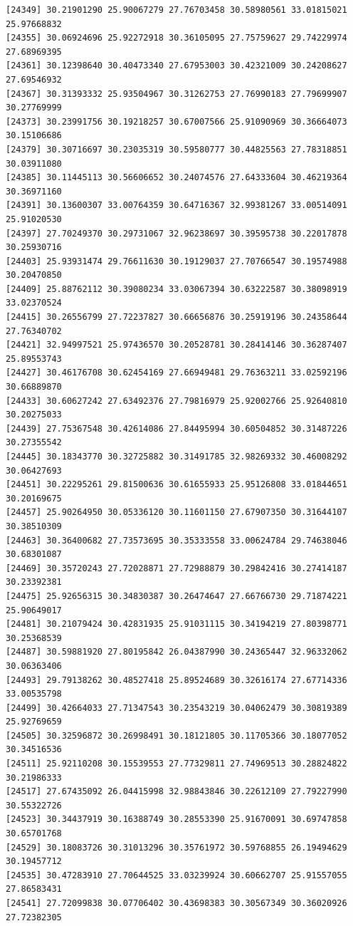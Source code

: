 \documentclass[
  letterpaper,
  DIV=11,
  numbers=noendperiod]{scrartcl}
\begin{document}
\begin{verbatim}
[24349] 30.21901290 25.90067279 27.76703458 30.58980561 33.01815021 25.97668832
[24355] 30.06924696 25.92272918 30.36105095 27.75759627 29.74229974 27.68969395
[24361] 30.12398640 30.40473340 27.67953003 30.42321009 30.24208627 27.69546932
[24367] 30.31393332 25.93504967 30.31262753 27.76990183 27.79699907 30.27769999
[24373] 30.23991756 30.19218257 30.67007566 25.91090969 30.36664073 30.15106686
[24379] 30.30716697 30.23035319 30.59580777 30.44825563 27.78318851 30.03911080
[24385] 30.11445113 30.56606652 30.24074576 27.64333604 30.46219364 30.36971160
[24391] 30.13600307 33.00764359 30.64716367 32.99381267 33.00514091 25.91020530
[24397] 27.70249370 30.29731067 32.96238697 30.39595738 30.22017878 30.25930716
[24403] 25.93931474 29.76611630 30.19129037 27.70766547 30.19574988 30.20470850
[24409] 25.88762112 30.39080234 33.03067394 30.63222587 30.38098919 33.02370524
[24415] 30.26556799 27.72237827 30.66656876 30.25919196 30.24358644 27.76340702
[24421] 32.94997521 25.97436570 30.20528781 30.28414146 30.36287407 25.89553743
[24427] 30.46176708 30.62454169 27.66949481 29.76363211 33.02592196 30.66889870
[24433] 30.60627242 27.63492376 27.79816979 25.92002766 25.92640810 30.20275033
[24439] 27.75367548 30.42614086 27.84495994 30.60504852 30.31487226 30.27355542
[24445] 30.18343770 30.32725882 30.31491785 32.98269332 30.46008292 30.06427693
[24451] 30.22295261 29.81500636 30.61655933 25.95126808 33.01844651 30.20169675
[24457] 25.90264950 30.05336120 30.11601150 27.67907350 30.31644107 30.38510309
[24463] 30.36400682 27.73573695 30.35333558 33.00624784 29.74638046 30.68301087
[24469] 30.35720243 27.72028871 27.72988879 30.29842416 30.27414187 30.23392381
[24475] 25.92656315 30.34830387 30.26474647 27.66766730 29.71874221 25.90649017
[24481] 30.21079424 30.42831935 25.91031115 30.34194219 27.80398771 30.25368539
[24487] 30.59881920 27.80195842 26.04387990 30.24365447 32.96332062 30.06363406
[24493] 29.79138262 30.48527418 25.89524689 30.32616174 27.67714336 33.00535798
[24499] 30.42664033 27.71347543 30.23543219 30.04062479 30.30819389 25.92769659
[24505] 30.32596872 30.26998491 30.18121805 30.11705366 30.18077052 30.34516536
[24511] 25.92110208 30.15539553 27.77329811 27.74969513 30.28824822 30.21986333
[24517] 27.67435092 26.04415998 32.98843846 30.22612109 27.79227990 30.55322726
[24523] 30.34437919 30.16388749 30.28553390 25.91670091 30.69747858 30.65701768
[24529] 30.18083726 30.31013296 30.35761972 30.59768855 26.19494629 30.19457712
[24535] 30.47283910 27.70644525 33.03239924 30.60662707 25.91557055 27.86583431
[24541] 27.72099838 30.07706402 30.43698383 30.30567349 30.36020926 27.72382305

\end{verbatim}
\end{document}
